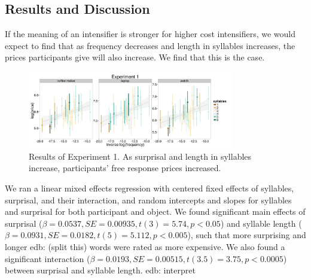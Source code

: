\documentclass[10pt,letterpaper]{article}
\newcommand{\todo}[1]{{\color{red}#1}}
\begin{document}
\subsection{Results and Discussion}

If the meaning of an intensifier is stronger for higher cost intensifiers, we would expect to find that as frequency decreases and length in syllables increases, the prices participants give will also increase. We find that this is the case.

\begin{figure}[ht]
\begin{center}
\includegraphics[width=0.8\textwidth]{analysis_files_for_writeup/images/exp1-plot.png}
\end{center}
\caption{Results of Experiment 1. As surprisal and length in syllables increase, participants' free response prices increased.} 
\label{exp1-plot}
\end{figure}

We ran a linear mixed effects regression with centered fixed effects of syllables, surprisal, and their interaction, and random intercepts and slopes for syllables and surprisal for both participant and object.
We found significant main effects of surprisal ($\beta=0.0537, SE=0.00935, t(3)=5.74, p<0.05$) and syllable length ($\beta=0.0931, SE=0.0182, t(5)=5.112, p<0.005$), such that more surprising and longer 
\todo{edb: (split this}) 
words were rated as more expensive. We also found a significant interaction ($\beta=0.0193, SE=0.00515, t(3.5)=3.75, p<0.0005$) between surprisal and syllable length.
\todo{edb: interpret}
\end{document}
